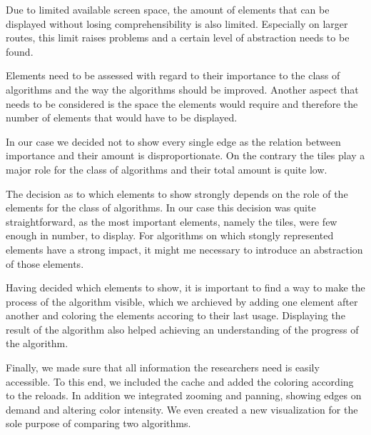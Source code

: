 \documentclass
[
    paper = a4,
    pagesize,
    12 pt,
    oneside,                       %
    open = right,
    DIV = calc,
    BCOR = 0 mm,                   %
    bibtotoc
]
{scrbook}
\begin{document}
Due to limited available screen space, the amount of elements that can be displayed without losing comprehensibility is also limited.
Especially on larger routes, this limit raises problems and a certain level of abstraction needs to be found.

Elements need to be assessed with regard to their importance to the class of algorithms and the way the algorithms should be improved.
Another aspect that needs to be considered is the space the elements would require and therefore the number of elements that would have to be displayed.

In our case we decided not to show every single edge as the relation between importance and their amount is disproportionate.
On the contrary the tiles play a major role for the class of algorithms and their total amount is quite low.

The decision as to which elements to show strongly depends on the role of the elements for the class of algorithms.
In our case this decision was quite straightforward, as the most important elements, namely the tiles, were few enough in number, to display.
For algorithms on which stongly represented elements have a strong impact, it might me necessary to introduce an abstraction of those elements.

Having decided which elements to show, it is important to find a way to make the process of the algorithm visible, which we archieved by adding one element after another and coloring the elements accoring to their last usage.
Displaying the result of the algorithm also helped achieving an understanding of the progress of the algorithm.

Finally, we made sure that all information the researchers need is easily accessible.
To this end, we included the cache and added the coloring according to the reloads.
In addition we integrated zooming and panning, showing edges on demand and altering color intensity.
We even created a new visualization for the sole purpose of comparing two algorithms.




%
\end{document}
